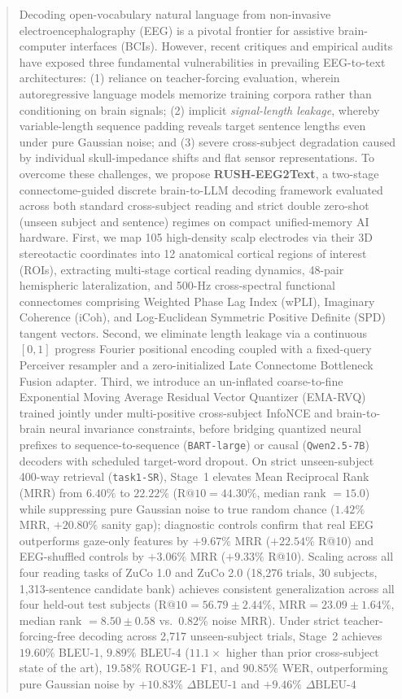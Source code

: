 \documentclass[journal]{IEEEtran}
\begin{document}
\begin{abstract}
Decoding open-vocabulary natural language from non-invasive electroencephalography (EEG) is a pivotal frontier for assistive brain-computer interfaces (BCIs). However, recent critiques and empirical audits have exposed three fundamental vulnerabilities in prevailing EEG-to-text architectures: (1) reliance on teacher-forcing evaluation, wherein autoregressive language models memorize training corpora rather than conditioning on brain signals; (2) implicit \textit{signal-length leakage}, whereby variable-length sequence padding reveals target sentence lengths even under pure Gaussian noise; and (3) severe cross-subject degradation caused by individual skull-impedance shifts and flat sensor representations. To overcome these challenges, we propose \textbf{RUSH-EEG2Text}, a two-stage connectome-guided discrete brain-to-LLM decoding framework evaluated across both standard cross-subject reading and strict double zero-shot (unseen subject and sentence) regimes on compact unified-memory AI hardware. First, we map 105 high-density scalp electrodes via their 3D stereotactic coordinates into 12 anatomical cortical regions of interest (ROIs), extracting multi-stage cortical reading dynamics, 48-pair hemispheric lateralization, and 500-Hz cross-spectral functional connectomes comprising Weighted Phase Lag Index (wPLI), Imaginary Coherence (iCoh), and Log-Euclidean Symmetric Positive Definite (SPD) tangent vectors. Second, we eliminate length leakage via a continuous $[0,1]$ progress Fourier positional encoding coupled with a fixed-query Perceiver resampler and a zero-initialized Late Connectome Bottleneck Fusion adapter. Third, we introduce an un-inflated coarse-to-fine Exponential Moving Average Residual Vector Quantizer (EMA-RVQ) trained jointly under multi-positive cross-subject InfoNCE and brain-to-brain neural invariance constraints, before bridging quantized neural prefixes to sequence-to-sequence (\texttt{BART-large}) or causal (\texttt{Qwen2.5-7B}) decoders with scheduled target-word dropout. On strict unseen-subject 400-way retrieval (\texttt{task1-SR}), Stage~1 elevates Mean Reciprocal Rank (MRR) from $6.40\%$ to $\mathbf{22.22\%}$ ($\text{R@10} = \mathbf{44.30\%}$, median rank $= \mathbf{15.0}$) while suppressing pure Gaussian noise to true random chance ($1.42\%$ MRR, $+\mathbf{20.80\%}$ sanity gap); diagnostic controls confirm that real EEG outperforms gaze-only features by $+9.67\%$ MRR ($+22.54\%$ R@10) and EEG-shuffled controls by $+3.06\%$ MRR ($+9.33\%$ R@10). Scaling across all four reading tasks of ZuCo 1.0 and ZuCo 2.0 (18,276 trials, 30 subjects, 1,313-sentence candidate bank) achieves consistent generalization across all four held-out test subjects ($\text{R@10} = \mathbf{56.79 \pm 2.44\%}$, $\text{MRR} = \mathbf{23.09 \pm 1.64\%}$, median rank $= \mathbf{8.50 \pm 0.58}$ vs.\ $0.82\%$ noise MRR). Under strict teacher-forcing-free decoding across 2,717 unseen-subject trials, Stage~2 achieves $\mathbf{19.60\%}$ BLEU-1, $\mathbf{9.89\%}$ BLEU-4 ($11.1\times$ higher than prior cross-subject state of the art), $\mathbf{19.58\%}$ ROUGE-1 F1, and $\mathbf{90.85\%}$ WER, outperforming pure Gaussian noise by $+\mathbf{10.83\%}$ $\Delta\text{BLEU-1}$ and $+\mathbf{9.46\%}$ $\Delta\text{BLEU-4}$ 
\end{abstract}
\end{document}
